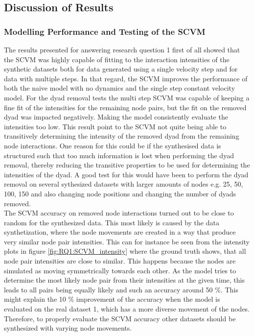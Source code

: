 \subsection{Discussion of Results}
\label{sec:Discussion:Results}


\subsubsection{Modelling Performance and Testing of the SCVM}
\label{sec:Discussion:Results:ModellingPerformance}

The results presented for answering research question 1 first of all showed that the SCVM was highly capable of fitting to the interaction intensities of the synthetic datasets both for data generated using a single velocity step and for data with multiple steps. In that regard, the SCVM improves the performance of both the naive  model with no dynamics and the single step constant velocity model. 
For the dyad removal tests the multi step SCVM was capable of keeping a fine fit of the intensities for the remaining node pairs, but the fit on the removed dyad was impacted negatively. Making the model consistently evaluate the intensities too low. This result point to the SCVM not quite being able to transitively determining the intensity of the removed dyad from the remaining node interactions. One reason for this could be if the synthesised data is structured such that too much information is lost when performing the dyad removal, thereby reducing the transitive properties to be used for determining the intensities of the dyad. A good test for this would have been to perform the dyad removal on several sythesized datasets with larger amounts of nodes e.g. 25, 50, 100, 150 and also changing node positions and changing the number of dyads removed.
\\
The SCVM accuracy on removed node interactions turned out to be close to random for the synthesized data. This most likely is caused by the data synthetization, where the node movements are created in a way that produce very similar node pair intensities. This can for instance be seen from the intensity plots in figure \ref{fig:RQ1:SCVM_intensity} where the ground truth shows, that all node pair intensities are close to similar. This happens because the nodes are simulated as moving symmetrically towards each other. As the model tries to determine the most likely node pair from their intensities at the given time, this leads to all pairs being equally likely and such an accuracy around 50 \%. This might explain the 10 \% improvement of the accuracy when the model is evaluated on the real dataset 1, which has a more diverse movement of the nodes. Therefore, to properly evaluate the SCVM accuracy other datasets should be synthesized with varying node movements.  


